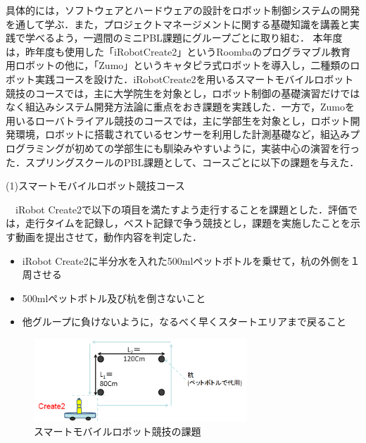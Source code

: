 \documentclass[submit]{ipsj}
\begin{document}
具体的には，ソフトウェアとハードウェアの設計をロボット制御システムの開発を通して学ぶ．また，プロジェクトマネージメントに関する基礎知識を講義と実践で学べるよう，一週間のミニPBL課題にグループごとに取り組む．
本年度は，昨年度も使用した「iRobotCreate2」というRoombaのプログラマブル教育用ロボットの他に，「Zumo」というキャタピラ式ロボットを導入し，二種類のロボット実践コースを設けた．iRobotCreate2を用いるスマートモバイルロボット競技のコースでは，主に大学院生を対象とし，ロボット制御の基礎演習だけではなく組込みシステム開発方法論に重点をおき課題を実践した．一方で，Zumoを用いるローバトライアル競技のコースでは，主に学部生を対象とし，ロボット開発環境，ロボットに搭載されているセンサーを利用した計測基礎など，組込みプログラミングが初めての学部生にも馴染みやすいように，実装中心の演習を行った．スプリングスクールのPBL課題として、コースごとに以下の課題を与えた．

\begin{description}
\item[(1)スマートモバイルロボット競技コース] 
\end{description}
　iRobot Create2で以下の項目を満たすよう走行することを課題とした．評価では，走行タイムを記録し，ベスト記録で争う競技とし，課題を実施したことを示す動画を提出させて，動作内容を判定した．
\begin{itemize}
\item iRobot Create2に半分水を入れた500mlペットボトルを乗せて，杭の外側を１周させる

\item 500mlペットボトル及び杭を倒さないこと

\item 他グループに負けないように，なるべく早くスタートエリアまで戻ること
\end{itemize}
\begin{figure}[h]
\centering
\includegraphics[width=8cm]{images/create2.png}
\caption{スマートモバイルロボット競技の課題} \label{fig:create2kadiai}
\end{figure}
\end{document}
